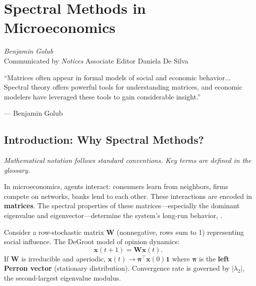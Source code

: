 \chapter{Spectral Methods in Microeconomics}
\label{ch:spectral} \cite{golub2026spectral}

\begin{flushright}
\textit{Benjamin Golub}\\
Communicated by \textit{Notices} Associate Editor Daniela De Silva
\end{flushright}

\epigraph{``Matrices often appear in formal models of social and economic behavior... Spectral theory offers powerful tools for understanding matrices, and economic modelers have leveraged these tools to gain considerable insight.''}{--- Benjamin Golub}

\begin{abstract}
Eigenvalues and eigenvectors are the hidden skeleton of networked systems. This chapter shows how Perron-Frobenius theory, Katz-Bonacich centrality, and spectral decomposition unify opinion dynamics, network games, and market equilibrium. The same mathematics describes how beliefs spread, how firms compete, and how central banks should act, \cite{golub2026spectral}.
\end{abstract}

\section{Introduction: Why Spectral Methods?}

\noindent\textit{Mathematical notation follows standard conventions. Key terms are defined in the glossary.}\n
\label{sec:spec:intro}

In microeconomics, agents interact: consumers learn from neighbors, firms compete on networks, banks lend to each other. These interactions are encoded in \textbf{matrices}. The spectral properties of these matrices---especially the dominant eigenvalue and eigenvector---determine the system's long-run behavior, \cite{golub2026spectral}.

Consider a row-stochastic matrix $\bm{W}$ (nonnegative, rows sum to 1) representing social influence. The DeGroot model of opinion dynamics:
\[
\bm{x}(t+1) = \bm{W} \bm{x}(t).
\]
If $\bm{W}$ is irreducible and aperiodic, $\bm{x}(t) \to \bm{\pi}^\top \bm{x}(0) \bm{1}$ where $\bm{\pi}$ is the \textbf{left Perron vector} (stationary distribution). Convergence rate is governed by $|\lambda_2|$, the second-largest eigenvalue modulus.

